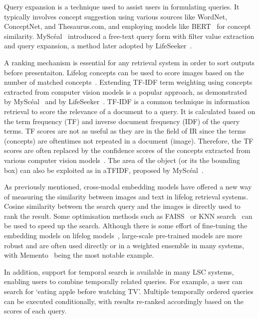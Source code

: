 \documentclass[11pt]{article}
\newcommand{\mysceal}{MySc{\'e}al}
\begin{document}
Query expansion is a technique used to assist users in formulating queries. It typically involves concept suggestion using various sources like WordNet, ConceptNet, and Thesaurus.com, and employing models like BERT~\cite{devlin2018bert} for concept similarity. \mysceal~\cite{emysceal2022} introduced a free-text query form with filter value extraction and query expansion, a method later adopted by LifeSeeker~\cite{nguyen2023lifeseeker}.

A ranking mechanism is essential for any retrieval system in order to sort outputs before presentaiton. Lifelog concepts can be used to score images based on the number of matched concepts~\cite{zhou_baseline_2017}. Extending TF-IDF term weighting using concepts extracted from computer vision models is a popular approach, as demonstrated by \mysceal~\cite{emysceal2022} and by LifeSeeker~\cite{nguyen2023lifeseeker}. TF-IDF is a common technique in information retrieval to score the relevance of a document to a query. It is calculated based on the term frequency (TF) and inverse document frequency (IDF) of the query terms. TF scores are not as useful as they are in the field of IR since the terms (concepts) are oftentimes not repeated in a document (image). Therefore, the TF scores are often replaced by the confidence scores of the concepts extracted from various computer vision models~\cite{dogariu_multimedia_nodate}. The area of the object (or its the bounding box) can also be exploited as in aTFIDF, proposed by \mysceal~\cite{emysceal2022}. 

As previously mentioned, cross-modal embedding models have offered a new way of measuring the similarity between images and text in lifelog retrieval systems. Cosine similarity between the search query and the images is directly used to rank the result. Some optimisation methods such as FAISS~\cite{johnson2019billion} or KNN search~\cite{emysceal2022} can be used to speed up the search. Although there is some effort of fine-tuning the embedding models on lifelog models~\cite{tran2022exploration}, large-scale pre-trained models are more robust and are often used directly or in a weighted ensemble in many systems, with Memento~\cite{alam2023memento} being the most notable example.

In addition, support for temporal search  is available in many LSC systems, enabling users to combine temporally related queries. For example, a user can search for `eating apple before watching TV'. Multiple temporally ordered queries can be executed conditionally, with results re-ranked accordingly based on the scores of each query.
\end{document}

